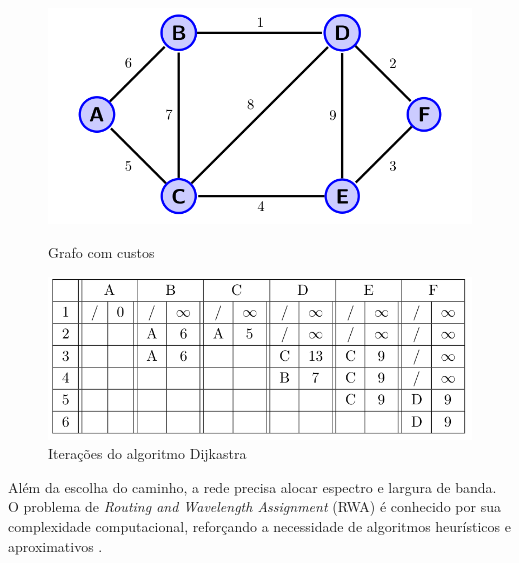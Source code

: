 \begin{figure}
  \begin{minipage}[c]{0.42\linewidth}
	\includegraphics[width=\linewidth]{./images/dijkastra_01.png}
	\caption{Grafo com custos}
	\label{fig:dijkastra_graph}
  \end{minipage}
  \hfill
  \begin{minipage}[c]{0.57\linewidth}
	\includegraphics[width=\linewidth]{./images/dijkastra_02.png}
	\caption{Iterações do algoritmo Dijkastra}
	\label{fig:dijkastra_table}
  \end{minipage}
\end{figure}


Além da escolha do caminho, a rede precisa alocar espectro e largura de banda.
O problema de \textit{Routing and Wavelength Assignment} (RWA) é conhecido por
sua complexidade computacional, reforçando a necessidade de algoritmos
heurísticos e aproximativos \cite{artigorwa}.

